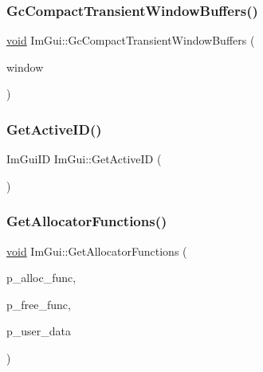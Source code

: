 \mbox{\label{namespaceImGui_a8386015888f38f2a33528ccbb34bd49d}} 
\subsubsection{\texorpdfstring{Gc\+Compact\+Transient\+Window\+Buffers()}{GcCompactTransientWindowBuffers()}}
{\footnotesize\ttfamily \hyperlink{imgui__impl__opengl3__loader_8h_ac668e7cffd9e2e9cfee428b9b2f34fa7}{void} Im\+Gui\+::\+Gc\+Compact\+Transient\+Window\+Buffers (\begin{DoxyParamCaption}\item[{\hyperlink{structImGuiWindow}{Im\+Gui\+Window} $\ast$}]{window }\end{DoxyParamCaption})}

\mbox{\label{namespaceImGui_a2577aabfddbb8c092a014cbdcc333204}} 
\subsubsection{\texorpdfstring{Get\+Active\+I\+D()}{GetActiveID()}}
{\footnotesize\ttfamily Im\+Gui\+ID Im\+Gui\+::\+Get\+Active\+ID (\begin{DoxyParamCaption}{ }\end{DoxyParamCaption})\hspace{0.3cm}{\ttfamily [inline]}}

\mbox{\label{namespaceImGui_a855f163c9a30e8af87aa9c56a3478b0e}} 
\subsubsection{\texorpdfstring{Get\+Allocator\+Functions()}{GetAllocatorFunctions()}}
{\footnotesize\ttfamily \hyperlink{imgui__impl__opengl3__loader_8h_ac668e7cffd9e2e9cfee428b9b2f34fa7}{void} Im\+Gui\+::\+Get\+Allocator\+Functions (\begin{DoxyParamCaption}\item[{\hyperlink{imgui_8h_a6c044dc9608e01ff454a2b6e3cc5a772}{Im\+Gui\+Mem\+Alloc\+Func} $\ast$}]{p\+\_\+alloc\+\_\+func,  }\item[{\hyperlink{imgui_8h_ad6abffbb2b01431575aad8400461d11f}{Im\+Gui\+Mem\+Free\+Func} $\ast$}]{p\+\_\+free\+\_\+func,  }\item[{\hyperlink{imgui__impl__opengl3__loader_8h_ac668e7cffd9e2e9cfee428b9b2f34fa7}{void} $\ast$$\ast$}]{p\+\_\+user\+\_\+data }\end{DoxyParamCaption})}

